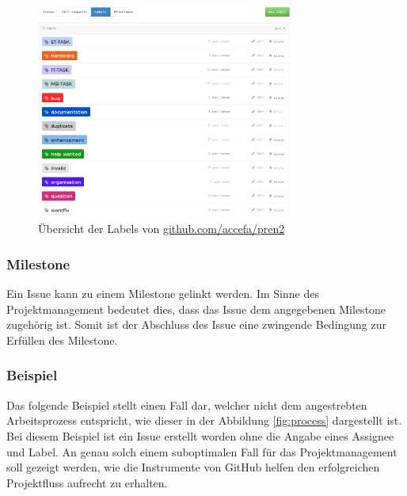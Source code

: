 \begin{figure}[h!]
	\centering
	\includegraphics[width=0.75\textwidth]{../../fig/github/labels.png}
	\caption{Übersicht der Labels von \url{github.com/accefa/pren2}}
	\label{fig:labels}
\end{figure}

\subsubsection{Milestone}
Ein \gls{Issue} kann zu einem \gls{Milestone} gelinkt werden. Im Sinne des
Projektmanagement bedeutet dies, dass das \gls{Issue} dem angegebenen
\gls{Milestone} zugehörig ist. Somit ist der Abschluss des \gls{Issue}
eine zwingende Bedingung zur Erfüllen des \gls{Milestone}.

\clearpage
\subsubsection{Beispiel}
Das folgende Beispiel stellt einen Fall dar, welcher nicht dem angestrebten
Arbeitsprozess entspricht, wie dieser in der Abbildung \ref{fig:process}
dargestellt ist. Bei diesem Beispiel ist ein \gls{Issue} erstellt worden ohne
die Angabe eines \gls{Assignee} und \gls{Label}. An genau solch einem
suboptimalen Fall für das Projektmanagement soll gezeigt werden, wie die
Instrumente von GitHub helfen den erfolgreichen Projektfluss aufrecht zu
erhalten. 

